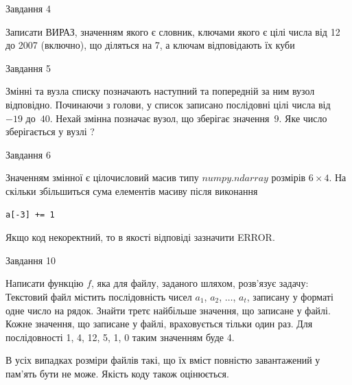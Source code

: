 \documentclass[12pt, ukrainian]{article}
\begin{document}
{               
{\begin{center}Завдання {4}\end{center}}
\vspace{-6mm}
Записати ВИРАЗ, значенням якого є словник, ключами якого є цілі числа від 12 до 2007 (включно), що діляться на 7, а ключам відповідають їх куби\par

\vspace{10mm}
               
{\begin{center}Завдання {5}\end{center}}
\vspace{-6mm}
Змінні  та  вузла списку позначають наступний та попередній за ним вузол відповідно. Починаючи з голови, у список записано послідовні цілі числа від~$-19$ до~$40$. Нехай змінна  позначає вузол, що зберігає значення~$9$.
Яке число зберігається у вузлі  ?\par

               
{\begin{center}Завдання {6}\end{center}}
\vspace{-6mm}
Значенням змінної  є цілочисловий масив типу $numpy.ndarray$ розмірів $6{\times}4$. На скільки збільшиться сума елементів масиву  після виконання
\begin{verbatim}
a[-3] += 1
\end{verbatim}


Якщо код некоректний, то в якості відповіді зазначити ERROR.\par

               
{\begin{center}Завдання {10}\end{center}}
\vspace{-6mm}

Написати функцію $f$, яка для файлу, заданого шляхом, розв’язує задачу:\\ Текстовий файл містить послідовність чисел $a_1$, $a_2$, $\ldots$, $a_t$, записану у форматі одне число на рядок. Знайти третє найбільше значення, що записане у файлі. Кожне значення, що записане у файлі, враховується тільки один раз. Для послідовності 1, 4, 12, 5, 1, 0 таким значенням буде 4.

В усіх випадках розміри файлів такі, що їх вміст повністю завантажений у пам'ять бути не може. Якість коду також оцінюється.



}
\end{document}
